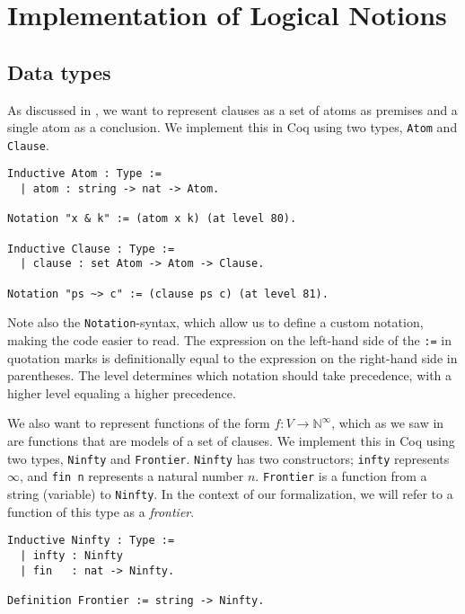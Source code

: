 \chapter{Implementation of Logical Notions}
\label{chap:implementation}

\section{Data types}

As discussed in , we want to represent clauses as
a set of atoms as premises and a single atom as a conclusion.
We implement this in Coq using two types, \lstinline{Atom} and \lstinline{Clause}.

\begin{minipage}{\linewidth}
\begin{lstlisting}[language=Coq, label={lst:atom_clause_def}, caption={\lstinline{Atom} and \lstinline{Clause} in Coq}]
Inductive Atom : Type :=
  | atom : string -> nat -> Atom.

Notation "x & k" := (atom x k) (at level 80).

Inductive Clause : Type :=
  | clause : set Atom -> Atom -> Clause.

Notation "ps ~> c" := (clause ps c) (at level 81).
\end{lstlisting}
\end{minipage}

Note also the \lstinline{Notation}-syntax, which allow us to define a custom notation,
making the code easier to read. The expression on the left-hand side of the \lstinline{:=} in quotation marks
is definitionally equal to the expression on the right-hand side in parentheses.
The level determines which notation should take precedence, with a higher level equaling a higher precedence.

We also want to represent functions of the form $f : V \rightarrow \mathbb{N}^{\infty}$,
which as we saw in 
are functions that are models of a set of clauses.
We implement this in Coq using two types, \lstinline{Ninfty} and \lstinline{Frontier}.
\lstinline{Ninfty} has two constructors; \lstinline{infty} represents $\infty$,
and \lstinline{fin n} represents a natural number $n$.
\lstinline{Frontier} is a function from a string (variable) to \lstinline{Ninfty}.
In the context of our formalization, we will refer to a function of this
type as a \emph{frontier}.

\begin{minipage}{\linewidth}
\begin{lstlisting}[language=Coq, label={lst:ninfty_frontier_def}, caption={\lstinline{Ninfty} and \lstinline{Frontier} in Coq}]
Inductive Ninfty : Type :=
  | infty : Ninfty
  | fin   : nat -> Ninfty.

Definition Frontier := string -> Ninfty.
\end{lstlisting}
\end{minipage}

